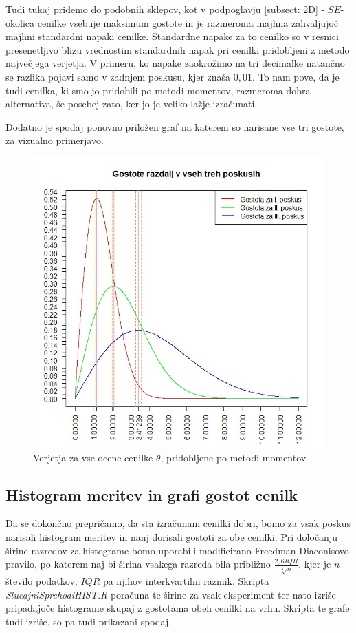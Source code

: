 \documentclass[a4paper, 10pt]{article}
\begin{document}
	Tudi tukaj pridemo do podobnih sklepov, kot v podpoglavju \ref{subsect: 2D} - $SE$-okolica cenilke vsebuje maksimum gostote in je razmeroma majhna zahvaljujoč majhni standardni napaki cenilke. Standardne napake za to cenilko so v resnici presenetljivo blizu vrednostim standardnih napak pri cenilki pridobljeni z metodo največjega verjetja. V primeru, ko napake zaokrožimo na tri decimalke natančno se razlika pojavi samo v zadnjem poskusu, kjer znaša $0{,}01$. To nam pove, da je tudi cenilka, ki smo jo pridobili po metodi momentov, razmeroma dobra alternativa, še posebej zato, ker jo je veliko lažje izračunati.
	
	Dodatno je spodaj ponovno priložen graf na katerem so narisane vse tri gostote, za vizualno primerjavo.
	\begin{figure}[h!]
		\label{fig: 2Eplot4}
		\centering
		\includegraphics[scale = 0.4]{VerjetjeMM4}
		\caption{Verjetja za vse ocene cenilke $\theta$, pridobljene po metodi momentov}
	\end{figure}
	
	\subsection{Histogram meritev in grafi gostot cenilk} \label{subsect: 2F}
	Da se dokončno prepričamo, da sta izračunani cenilki dobri, bomo za vsak poskus narisali histogram meritev in nanj dorisali gostoti za obe cenilki. Pri določanju širine razredov za histograme bomo uporabili modificirano Freedman-Diaconisovo pravilo, po katerem naj bi širina vsakega razreda bila približno $\frac{2{,}6IQR}{\sqrt[3]{n}}$, kjer je $n$ število podatkov, $IQR$ pa njihov interkvartilni razmik. Skripta \textit{SlucajniSprehodiHIST.R} poračuna te širine za vsak eksperiment ter nato izriše pripadajoče histograme skupaj z gostotama obeh cenilki na vrhu. Skripta te grafe tudi izriše, so pa tudi prikazani spodaj.
	
\end{document}
